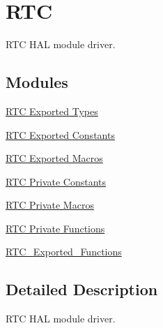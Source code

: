 \hypertarget{group___r_t_c}{}\section{R\+TC}
\label{group___r_t_c}


R\+TC H\+AL module driver.  


\subsection*{Modules}
\begin{DoxyCompactItemize}
\item 
\hyperlink{group___r_t_c___exported___types}{R\+T\+C Exported Types}
\item 
\hyperlink{group___r_t_c___exported___constants}{R\+T\+C Exported Constants}
\item 
\hyperlink{group___r_t_c___exported___macros}{R\+T\+C Exported Macros}
\item 
\hyperlink{group___r_t_c___private___constants}{R\+T\+C Private Constants}
\item 
\hyperlink{group___r_t_c___private___macros}{R\+T\+C Private Macros}
\item 
\hyperlink{group___r_t_c___private___functions}{R\+T\+C Private Functions}
\item 
\hyperlink{group___r_t_c___exported___functions}{R\+T\+C\+\_\+\+Exported\+\_\+\+Functions}
\end{DoxyCompactItemize}


\subsection{Detailed Description}
R\+TC H\+AL module driver. 

